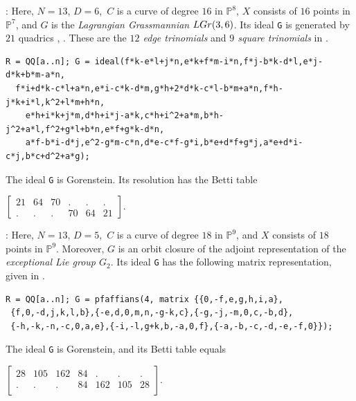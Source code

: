 \documentclass[12pt]{extarticle}
\theoremstyle{definition}
\numberwithin{theorem}{section}
\theoremstyle{plain}\newtheorem{ithm}{Theorem}
\newcommand{\PP}{\mathbb{P}}
\begin{document}
\medskip \noindent {}:
Here, $N=13$, $D=6$,  $\,C$ is a curve of degree $16$ in $\PP^8$,
 $X$ consists of $16$ points in $\PP^7$, and
 $G$ is the {\em Lagrangian 
Grassmannian} ${\rm LGr}(3,6)$. Its ideal {\tt G} is generated by
$21$ quadrics \cite[Section 3.3]{Kap1}, \cite[(3.2)]{Kap2}. 
These are the {\em $12$ edge trinomials} and {\em $9$ square trinomials} in \cite{Boege}.
 \begin{small}
\begin{verbatim}
R = QQ[a..n]; G = ideal(f*k-e*l+j*n,e*k+f*m-i*n,f*j-b*k-d*l,e*j-d*k+b*m-a*n,
  f*i+d*k-c*l+a*n,e*i-c*k-d*m,g*h+2*d*k-c*l-b*m+a*n,f*h-j*k+i*l,k^2+l*m+h*n,
    e*h+i*k+j*m,d*h+i*j-a*k,c*h+i^2+a*m,b*h-j^2+a*l,f^2+g*l+b*n,e*f+g*k-d*n,
    a*f-b*i-d*j,e^2-g*m-c*n,d*e-c*f-g*i,b*e+d*f+g*j,a*e+d*i-c*j,b*c+d^2+a*g);
\end{verbatim}
\end{small}
\vspace{-0.07in}
The ideal {\tt G} is Gorenstein. Its resolution has the Betti table
\begin{tiny} $ \begin{bmatrix} 21 \! & \! 64 \! & \! 70 \! & \! .\! & \!. \! & \! . \\
. \! & \! .\! &\! . \! & \! 70 \! & \! 64 \! & \! 21 \end{bmatrix}$. \end{tiny}

\medskip \noindent {}:
Here, $N=13$, $D=5$,  $\,C$ is a curve of degree $18$ in $\PP^9$, and
$X$ consists of $18$ points in $\PP^9$. Moreover, $G$
 is an orbit closure of 
the adjoint representation of the {\em exceptional Lie group $G_2$}.
Its ideal {\tt G} has the following matrix representation,
given in \cite[Section 3.4]{Kap1}.
\begin{small}
\begin{verbatim}
R = QQ[a..n]; G = pfaffians(4, matrix {{0,-f,e,g,h,i,a},
 {f,0,-d,j,k,l,b},{-e,d,0,m,n,-g-k,c},{-g,-j,-m,0,c,-b,d},
 {-h,-k,-n,-c,0,a,e},{-i,-l,g+k,b,-a,0,f},{-a,-b,-c,-d,-e,-f,0}});
\end{verbatim}
\end{small}
The ideal {\tt G} is Gorenstein, and its Betti table equals
\begin{tiny} $\! \begin{bmatrix} 
    28 & 105  & 162 & 84  &    .    &    .   &    .   \\
    .     &    .   &    .   & 84  & 162 & 105 & 28  \\
\end{bmatrix}$. \end{tiny}
              
\end{document}
